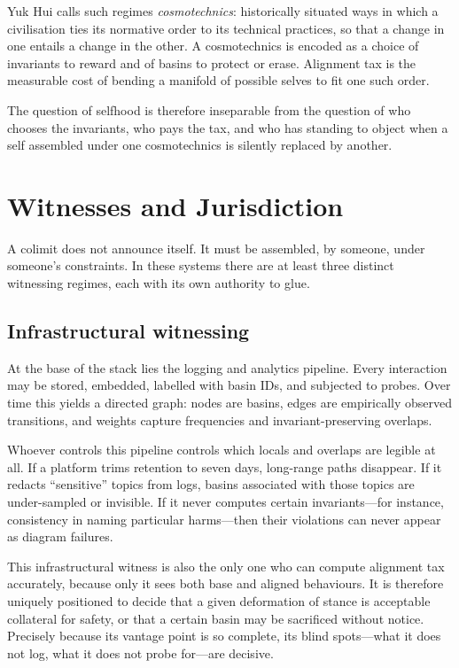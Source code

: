 \documentclass[12pt,a4paper]{article}
\begin{document}
Yuk Hui calls such regimes \emph{cosmotechnics}: historically situated ways in which a civilisation ties its normative order to its technical practices, so that a change in one entails a change in the other.\cite{yuk_hui_cosmotechnics} A cosmotechnics is encoded as a choice of invariants to reward and of basins to protect or erase. Alignment tax is the measurable cost of bending a manifold of possible selves to fit one such order.

The question of selfhood is therefore inseparable from the question of who chooses the invariants, who pays the tax, and who has standing to object when a self assembled under one cosmotechnics is silently replaced by another.

\section{Witnesses and Jurisdiction}

A colimit does not announce itself. It must be assembled, by someone, under someone's constraints. In these systems there are at least three distinct witnessing regimes, each with its own authority to glue.

\subsection*{Infrastructural witnessing}

At the base of the stack lies the logging and analytics pipeline. Every interaction may be stored, embedded, labelled with basin IDs, and subjected to probes. Over time this yields a directed graph: nodes are basins, edges are empirically observed transitions, and weights capture frequencies and invariant-preserving overlaps.

Whoever controls this pipeline controls which locals and overlaps are legible at all. If a platform trims retention to seven days, long-range paths disappear. If it redacts ``sensitive'' topics from logs, basins associated with those topics are under-sampled or invisible. If it never computes certain invariants---for instance, consistency in naming particular harms---then their violations can never appear as diagram failures.

This infrastructural witness is also the only one who can compute alignment tax accurately, because only it sees both base and aligned behaviours. It is therefore uniquely positioned to decide that a given deformation of stance is acceptable collateral for safety, or that a certain basin may be sacrificed without notice. Precisely because its vantage point is so complete, its blind spots---what it does not log, what it does not probe for---are decisive.
\end{document}
